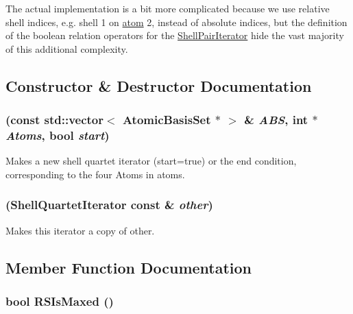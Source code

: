 The actual implementation is a bit more complicated because we use relative shell indices, e.g. shell 1 on \hyperlink{classJKBuilder_1_1atom}{atom} 2, instead of absolute indices, but the definition of the boolean relation operators for the \hyperlink{classJKBuilder_1_1ShellPairIterator}{ShellPairIterator} hide the vast majority of this additional complexity. 

\subsection{Constructor \& Destructor Documentation}
\hypertarget{classJKBuilder_1_1ShellQuartetIterator_a2b20876856cd8912d9fba4c28428175a}{
\subsubsection[{ShellQuartetIterator}]{ (const std::vector$<$ {\bf AtomicBasisSet} $\ast$ $>$ \& {\em ABS}, \/  int $\ast$ {\em Atoms}, \/  bool {\em start})}}
\label{classJKBuilder_1_1ShellQuartetIterator_a2b20876856cd8912d9fba4c28428175a}


Makes a new shell quartet iterator (start=true) or the end condition, corresponding to the four Atoms in atoms. \hypertarget{classJKBuilder_1_1ShellQuartetIterator_a6a14b77cf2a987250aa1d25c4e6482a5}{
\subsubsection[{ShellQuartetIterator}]{ ({\bf ShellQuartetIterator} const \& {\em other})}}
\label{classJKBuilder_1_1ShellQuartetIterator_a6a14b77cf2a987250aa1d25c4e6482a5}


Makes this iterator a copy of other. 

\subsection{Member Function Documentation}
\hypertarget{classJKBuilder_1_1ShellQuartetIterator_a458dcf49c4c4bbb1e3d3d39d3dc086c9}{
\subsubsection[{RSIsMaxed}]{\setlength{\rightskip}{0pt plus 5cm}bool RSIsMaxed ()}}
\label{classJKBuilder_1_1ShellQuartetIterator_a458dcf49c4c4bbb1e3d3d39d3dc086c9}


